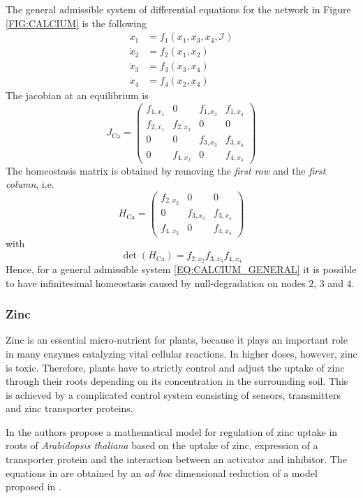 \documentclass[a4paper,fleqn]{cas-dc}
\begin{document}
The general admissible system of differential equations for the network in Figure \ref{FIG:CALCIUM} is the following
\begin{equation} \label{EQ:CALCIUM_GENERAL}
\begin{aligned}
\dot{x}_1 & = f_1(x_1,x_3,x_4,\mathcal{I}) \\
\dot{x}_2 & = f_2(x_1,x_2) \\
\dot{x}_3 & = f_3(x_3,x_4) \\
\dot{x}_4 & = f_4(x_2,x_4)
\end{aligned}
\end{equation}
The jacobian at an equilibrium is
\[
J_{\mathrm{Ca}}  = \begin{pmatrix}
f_{1,x_1}& 0 & f_{1,x_3} & f_{1,x_4}   \\
f_{2,x_1} & f_{2,x_2} & 0 & 0 \\
0 & 0 & f_{3,x_3} & f_{3,x_4} \\
0 & f_{4,x_2} & 0 & f_{4,x_4}  
\end{pmatrix}
\]
The homeostasis matrix is obtained by removing the \emph{first row} and the \emph{first column}, i.e.
\[
H_{\mathrm{Ca}} = \begin{pmatrix}
f_{2,x_2} & 0 & 0 \\
0 & f_{3,x_3} & f_{3,x_4} \\
f_{4,x_2} & 0 & f_{4,x_4}  
\end{pmatrix}
\]
with 
\[
\det(H_{\mathrm{Ca}}) = f_{2,x_2} f_{3,x_3} f_{4,x_4}
\]
Hence, for a general admissible system  \eqref{EQ:CALCIUM_GENERAL} it is possible to have infinitesimal homeostasis caused by null-degradation on nodes $2$, $3$ and $4$.

\subsubsection{Zinc}

Zinc is an essential micro-nutrient for plants, because it plays an important role in many enzymes catalyzing vital cellular reactions. 
In higher doses, however, zinc is toxic. 
Therefore, plants have to strictly control and adjust the uptake of zinc through their roots depending on its concentration in the surrounding soil.
This is achieved by a complicated control system consisting of sensors, transmitters and zinc transporter proteins.

In \cite{claus2015} the authors propose a mathematical model for regulation of zinc uptake in roots of \emph{Arabidopsis thaliana} based on the uptake of zinc, expression of a transporter protein and the interaction between an activator and inhibitor.
The equations in \cite{claus2015} are obtained by an \emph{ad hoc} dimensional reduction of a model proposed in \cite{claus2012}.
\end{document}

